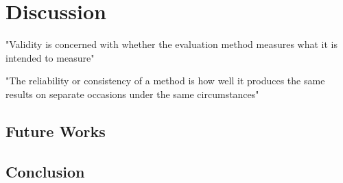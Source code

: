 \chapter{Discussion}
"Validity is concerned with whether the evaluation method measures what it is intended to measure"\cite{interactionDesign}

"The reliability or consistency of a method is how well it produces the same results on separate occasions under the same circumstances"\cite{interactionDesign}

\section {Future Works}


\section {Conclusion}
